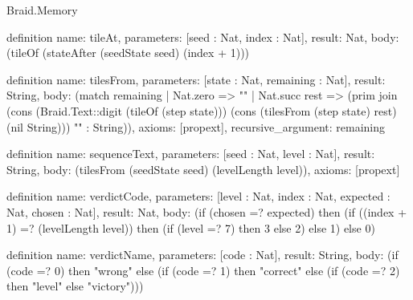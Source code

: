 \begin{lexlean}{Braid.Memory}
\begin{semanticmodule}
definition{
  name: tileAt,
  parameters: [seed : Nat, index : Nat],
  result: Nat,
  body: (tileOf (stateAfter (seedState seed) (index + 1)))
}

definition{
  name: tilesFrom,
  parameters: [state : Nat, remaining : Nat],
  result: String,
  body: (match remaining
    | Nat.zero => ""
    | Nat.succ rest => (prim join (cons (Braid.Text::digit (tileOf (step state))) (cons (tilesFrom (step state) rest) (nil String))) "" : String)),
  axioms: [propext],
  recursive_argument: remaining
}

definition{
  name: sequenceText,
  parameters: [seed : Nat, level : Nat],
  result: String,
  body: (tilesFrom (seedState seed) (levelLength level)),
  axioms: [propext]
}

definition{
  name: verdictCode,
  parameters: [level : Nat, index : Nat, expected : Nat, chosen : Nat],
  result: Nat,
  body: (if (chosen =? expected) then (if ((index + 1) =? (levelLength level)) then (if (level =? 7) then 3 else 2) else 1) else 0)
}

definition{
  name: verdictName,
  parameters: [code : Nat],
  result: String,
  body: (if (code =? 0) then "wrong" else (if (code =? 1) then "correct" else (if (code =? 2) then "level" else "victory")))
}
\end{semanticmodule}
\end{lexlean}
